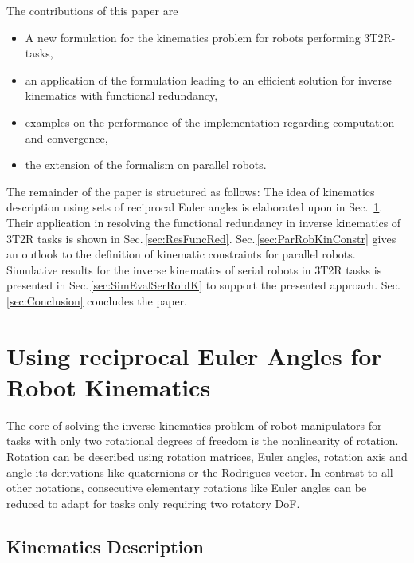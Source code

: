 \documentclass[twocolumn,10pt]{IFTOMM}
\begin{document}
The contributions of this paper are
\begin{itemize}
    \item A new formulation for the kinematics problem for robots performing 3T2R-tasks,
    \item an application of the formulation leading to an efficient solution for inverse kinematics with functional redundancy,
    \item examples on the performance of the implementation regarding computation and convergence,
    \item the extension of the formalism on parallel robots.
\end{itemize}

The remainder of the paper is structured as follows: The idea of kinematics description using sets of reciprocal Euler angles is elaborated upon in Sec.\, \ref{sec:RecEulAng}.
Their application in resolving the functional redundancy in inverse kinematics of 3T2R tasks is shown in Sec.\,\ref{sec:ResFuncRed}.
Sec.\,\ref{sec:ParRobKinConstr} gives an outlook to the definition of kinematic constraints for parallel robots. 
Simulative results for the inverse kinematics of serial robots in 3T2R tasks is presented in Sec.\,\ref{sec:SimEvalSerRobIK} to support the presented approach. Sec.\,\ref{sec:Conclusion} concludes the paper.

\section{Using reciprocal Euler Angles for Robot Kinematics}
\label{sec:RecEulAng}

The core of solving the inverse kinematics problem of robot manipulators for tasks with only two rotational degrees of freedom is the nonlinearity of rotation.
Rotation can be described using rotation matrices, Euler angles, rotation axis and angle its derivations like quaternions or the Rodrigues vector.
In contrast to all other notations, consecutive elementary rotations like Euler angles can be reduced to adapt for tasks only requiring two rotatory DoF.

\subsection{Kinematics Description}
\label{sec:RecEulAng_KinDesc}
\end{document}
